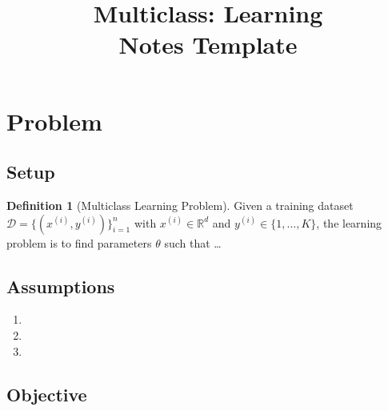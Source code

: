 \documentclass[11pt]{article}
\theoremstyle{definition}
\newtheorem{definition}[theorem]{Definition}
\theoremstyle{remark}
\newcommand{\R}{\mathbb{R}}
\newcommand{\K}{K}  %
\begin{document}
\title{\textbf{Multiclass: Learning}\\[0.4em]
       \large Notes Template}
\author{}
\date{}
\maketitle
\tableofcontents
\newpage

\section{Problem}

\subsection{Setup}


\begin{definition}[Multiclass Learning Problem]
    Given a training dataset
    $\mathcal{D} = \{(x^{(i)}, y^{(i)})\}_{i=1}^{n}$
    with $x^{(i)} \in \R^{d}$ and $y^{(i)} \in \{1, \ldots, \K\}$,
    the learning problem is to find parameters $\theta$ such that \ldots
\end{definition}

\subsection{Assumptions}

\begin{enumerate}[label=\textbf{A\arabic*.}]
    \item %
    \item %
    \item %
\end{enumerate}

\subsection{Objective}
\end{document}
